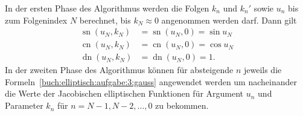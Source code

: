 \begin{loesung}
In der ersten Phase des Algorithmus werden die Folgen $k_n$ und $k_n'$ 
sowie $u_n$ bis zum Folgenindex $N$ berechnet, bis $k_N\approx 0$
angenommen werden darf.
Dann gilt
\begin{align*}
\operatorname{sn}(u_N, k_N) &= \operatorname{sn}(u_N,0) = \sin u_N
\\
\operatorname{cn}(u_N, k_N) &= \operatorname{cn}(u_N,0) = \cos u_N
\\
\operatorname{dn}(u_N, k_N) &= \operatorname{dn}(u_N,0) = 1.
\end{align*}
In der zweiten Phase des Algorithmus können für absteigende
$n$ jeweils die Formeln~\eqref{buch:elliptisch:aufgabe:3:gauss}
angewendet werden um nacheinander die Werte der Jacobischen
elliptischen Funktionen für Argument $u_n$ und Parameter $k_n$
für $n=N-1,N-2,\dots,0$ zu bekommen.
\end{loesung}

